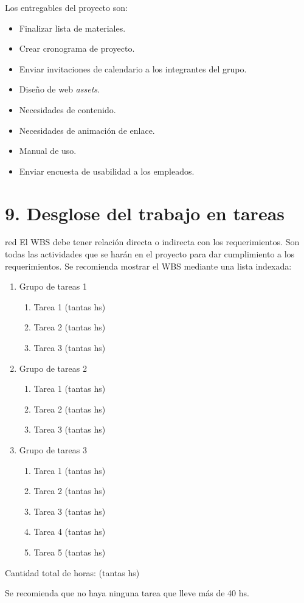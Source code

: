 \documentclass[
11pt, %
]{charter}
\begin{document}
Los entregables del proyecto son:

\begin{itemize}
	\item Finalizar lista de materiales.
	\item Crear cronograma de proyecto.
	\item Enviar invitaciones de calendario a los integrantes del grupo.
	\item Diseño de web \textit{assets}.
	\item Necesidades de contenido.
	\item Necesidades de animación de enlace.
	\item Manual de uso.
	\item Enviar encuesta de usabilidad a los empleados.
\end{itemize}



\section{9. Desglose del trabajo en tareas}
\label{sec:wbs}

\begin{consigna}{red}
El WBS debe tener relación directa o indirecta con los requerimientos.  Son todas las actividades que se harán en el proyecto para dar cumplimiento a los requerimientos. Se recomienda mostrar el WBS mediante una lista indexada:

\begin{enumerate}
\item Grupo de tareas 1
	\begin{enumerate}
	\item Tarea 1 (tantas hs)
	\item Tarea 2 (tantas hs)
	\item Tarea 3 (tantas hs)
	\end{enumerate}
\item Grupo de tareas 2
	\begin{enumerate}
	\item Tarea 1 (tantas hs)
	\item Tarea 2 (tantas hs)
	\item Tarea 3 (tantas hs)
	\end{enumerate}
\item Grupo de tareas 3
	\begin{enumerate}
	\item Tarea 1 (tantas hs)
	\item Tarea 2 (tantas hs)
	\item Tarea 3 (tantas hs)
	\item Tarea 4 (tantas hs)
	\item Tarea 5 (tantas hs)
	\end{enumerate}
\end{enumerate}

Cantidad total de horas: (tantas hs)

Se recomienda que no haya ninguna tarea que lleve más de 40 hs. 

\end{consigna}
\end{document}
